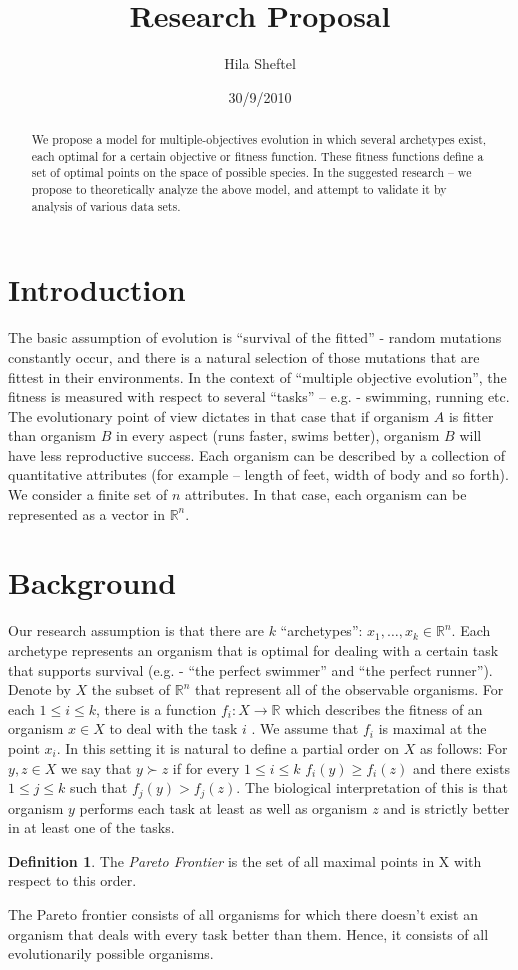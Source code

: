 \documentclass{article}
\title{Research Proposal}
\author{Hila Sheftel}
\date{30/9/2010}
\theoremstyle{definition}
\newtheorem*{define}{Definition}
\theoremstyle{remark}
\begin{document}
\begin{abstract}
We propose a model for multiple-objectives evolution in which several archetypes exist, 
each optimal for a certain objective or fitness function. 
These fitness functions define a set of optimal points on the space of possible species. In the suggested research – we propose to theoretically analyze the above model, and attempt to validate it by analysis of various data sets.
\end{abstract}
\section{Introduction}
The basic assumption of evolution is “survival of the fitted” - 
random mutations constantly occur, and there is a natural selection of those  mutations that are fittest in their environments. 
In the context of “multiple objective evolution”, 
the fitness is measured with respect to several “tasks” – e.g. - swimming, running etc. 
The evolutionary point of view dictates in that case that if organism $A$ is fitter than organism $B$ in every aspect 
(runs faster, swims better), organism $B$ will have less reproductive success. 
Each organism can be described by a collection of quantitative attributes 
(for example – length of feet, width of body and so forth). 
We consider a finite set of $n$ attributes. In that case, each organism can be represented as a vector in $\mathbb{R}^n$.
\section{Background}
Our research assumption is that there are $k$ “archetypes”: $x_1,\ldots,x_k \in \mathbb{R}^n$. 
Each archetype represents an organism that is optimal for dealing with a certain task that supports survival 
(e.g. - “the perfect swimmer” and “the perfect runner”). 
Denote by $X$ the subset of $\mathbb{R}^n$ that represent all of the observable organisms. 
For each $1\leq i \leq k$, there is a function $f_i: X \rightarrow \mathbb{R}$ 
which describes the fitness of an organism $x \in X$ to deal with the task $i$ . 
We assume that $f_i$ is maximal at the point $x_i$.
In this setting it is natural to define a partial order on $X$ as follows: 
For $y,z \in X$ we say that $y \succ z$ if for every $1\leq i \leq k$ $f_i(y)\geq f_i(z)$ 
and there exists $1\leq j \leq k$ such that $f_j(y) > f_j(z)$. 
The biological interpretation of this is that organism $y$ performs each task at least as well as organism $z$ 
and is strictly better in at least one of the tasks. 
\begin{define}
The \textit{Pareto Frontier} is the set of all maximal points in X with respect to this order.
\end{define}
The Pareto frontier consists of all organisms for which there doesn’t exist an organism that deals with every task better than them. 
Hence, it consists of all evolutionarily possible organisms. 
\end{document}
